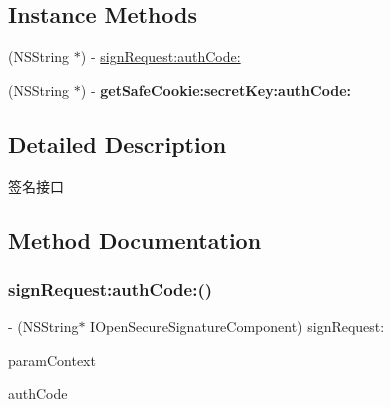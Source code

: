 \subsection*{Instance Methods}
\begin{DoxyCompactItemize}
\item 
(N\+S\+String $\ast$) -\/ \mbox{\hyperlink{protocol_i_open_secure_signature_component_01-p_aa8f53a8007cee37fd0a3ff43b8225c4f}{sign\+Request\+:auth\+Code\+:}}
\item 
\mbox{\label{protocol_i_open_secure_signature_component_01-p_a10ba24a4e7378061b79bd0f7ee6e74f1}} 
(N\+S\+String $\ast$) -\/ {\bfseries get\+Safe\+Cookie\+:secret\+Key\+:auth\+Code\+:}
\end{DoxyCompactItemize}


\subsection{Detailed Description}
签名接口 

\subsection{Method Documentation}
\mbox{\label{protocol_i_open_secure_signature_component_01-p_aa8f53a8007cee37fd0a3ff43b8225c4f}} 
\subsubsection{\texorpdfstring{sign\+Request\+:auth\+Code\+:()}{signRequest:authCode:()}}
{\footnotesize\ttfamily -\/ (N\+S\+String$\ast$ I\+Open\+Secure\+Signature\+Component) sign\+Request\+: \begin{DoxyParamCaption}\item[{(\mbox{\hyperlink{interface_open_security_guard_param_context}{Open\+Security\+Guard\+Param\+Context}} $\ast$)}]{param\+Context }\item[{authCode:(N\+S\+String $\ast$)}]{auth\+Code }\end{DoxyParamCaption}}

